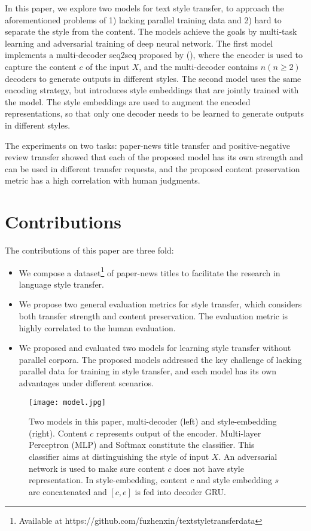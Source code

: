 \documentclass[letterpaper]{article} \usepackage{aaai18}  \usepackage{times}  \usepackage{helvet}  \usepackage{courier}  \usepackage{url}  \usepackage{graphicx}  \usepackage{amsmath}
\newcommand{\newcite}[1]{\citeauthor{#1} (\citeyear{#1})}
\begin{document}
In this paper, we explore two models for text style transfer, to approach the aforementioned problems of 1) lacking parallel training data and 2) hard to separate  the style from the content. 
The models achieve the goals by multi-task learning \cite{caruana1998multitask} and adversarial training \cite{goodfellow2014generative} of deep neural network.
The first model implements a multi-decoder seq2seq proposed by \newcite{sutskever2014sequence}, 
where the encoder is used to capture the content $c$ of the input $X$, and the 
multi-decoder contains $n ( n \geq 2)$ decoders to generate outputs in different styles. 
The second model uses the same encoding strategy, but introduces style embeddings that are jointly 
trained with the model. The style embeddings are used to augment the encoded representations, so 
that only one decoder needs to be learned to generate outputs in different styles. 

The experiments on two tasks: paper-news title transfer and positive-negative review transfer showed that 
each of the proposed model has its own strength and can be used in different transfer requests, and the proposed content preservation metric has a high correlation with human judgments.


\section{Contributions}
The contributions of this paper are three fold:
\begin{itemize}
\item We compose a dataset\footnote{Available at https://github.com/fuzhenxin/textstyletransferdata} of paper-news titles to facilitate the research in language style transfer. 
\item We propose two general evaluation metrics for style transfer, 
which considers both transfer strength and content preservation. 
The evaluation metric is highly correlated to the human evaluation. 
\item We proposed and evaluated two models for learning style transfer without parallel corpora.  
The proposed models addressed the key challenge of lacking parallel data for training in style transfer,  
and each model has its own advantages under different scenarios.

\end{itemize}




\begin{figure*}[htb]
\centering
\texttt{[image: model.jpg]}
\caption{Two models in this paper, multi-decoder (left) and style-embedding (right). 
   Content $c$ represents output of the encoder. 
   Multi-layer Perceptron (MLP) and Softmax constitute the classifier. 
   This classifier aims at distinguishing the style of input $X$. 
   An adversarial network is used to make sure content $c$ does not have style representation. 
   In style-embedding, content $c$ and style embedding $s$ are concatenated and $[c,e]$ is fed into decoder GRU. }
\label{figure_model}
\end{figure*}
\end{document}

